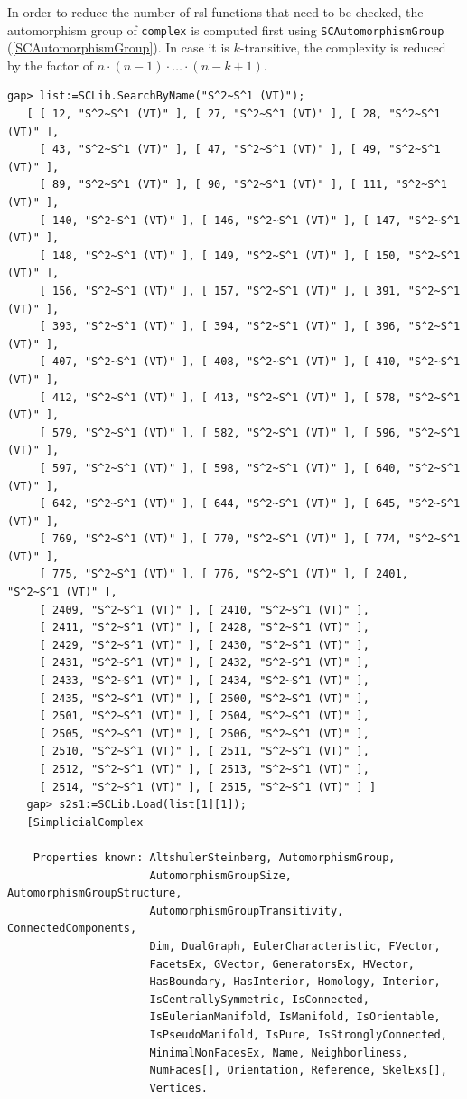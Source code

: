 \documentclass[a4paper,11pt]{report}
\begin{document}
{{{ In order to reduce the number of rsl-functions that need to be checked, the
automorphism group of \texttt{complex} is computed first using \texttt{SCAutomorphismGroup} (\ref{SCAutomorphismGroup}). In case it is $k$-transitive, the complexity is reduced by the factor of $n \cdot (n-1) \cdot \dots \cdot (n-k+1)$. 
\begin{Verbatim}[commandchars=!@|,fontsize=\small,frame=single,label=Example]
   gap> list:=SCLib.SearchByName("S^2~S^1 (VT)");
   [ [ 12, "S^2~S^1 (VT)" ], [ 27, "S^2~S^1 (VT)" ], [ 28, "S^2~S^1 (VT)" ], 
     [ 43, "S^2~S^1 (VT)" ], [ 47, "S^2~S^1 (VT)" ], [ 49, "S^2~S^1 (VT)" ], 
     [ 89, "S^2~S^1 (VT)" ], [ 90, "S^2~S^1 (VT)" ], [ 111, "S^2~S^1 (VT)" ], 
     [ 140, "S^2~S^1 (VT)" ], [ 146, "S^2~S^1 (VT)" ], [ 147, "S^2~S^1 (VT)" ], 
     [ 148, "S^2~S^1 (VT)" ], [ 149, "S^2~S^1 (VT)" ], [ 150, "S^2~S^1 (VT)" ], 
     [ 156, "S^2~S^1 (VT)" ], [ 157, "S^2~S^1 (VT)" ], [ 391, "S^2~S^1 (VT)" ], 
     [ 393, "S^2~S^1 (VT)" ], [ 394, "S^2~S^1 (VT)" ], [ 396, "S^2~S^1 (VT)" ], 
     [ 407, "S^2~S^1 (VT)" ], [ 408, "S^2~S^1 (VT)" ], [ 410, "S^2~S^1 (VT)" ], 
     [ 412, "S^2~S^1 (VT)" ], [ 413, "S^2~S^1 (VT)" ], [ 578, "S^2~S^1 (VT)" ], 
     [ 579, "S^2~S^1 (VT)" ], [ 582, "S^2~S^1 (VT)" ], [ 596, "S^2~S^1 (VT)" ], 
     [ 597, "S^2~S^1 (VT)" ], [ 598, "S^2~S^1 (VT)" ], [ 640, "S^2~S^1 (VT)" ], 
     [ 642, "S^2~S^1 (VT)" ], [ 644, "S^2~S^1 (VT)" ], [ 645, "S^2~S^1 (VT)" ], 
     [ 769, "S^2~S^1 (VT)" ], [ 770, "S^2~S^1 (VT)" ], [ 774, "S^2~S^1 (VT)" ], 
     [ 775, "S^2~S^1 (VT)" ], [ 776, "S^2~S^1 (VT)" ], [ 2401, "S^2~S^1 (VT)" ], 
     [ 2409, "S^2~S^1 (VT)" ], [ 2410, "S^2~S^1 (VT)" ], 
     [ 2411, "S^2~S^1 (VT)" ], [ 2428, "S^2~S^1 (VT)" ], 
     [ 2429, "S^2~S^1 (VT)" ], [ 2430, "S^2~S^1 (VT)" ], 
     [ 2431, "S^2~S^1 (VT)" ], [ 2432, "S^2~S^1 (VT)" ], 
     [ 2433, "S^2~S^1 (VT)" ], [ 2434, "S^2~S^1 (VT)" ], 
     [ 2435, "S^2~S^1 (VT)" ], [ 2500, "S^2~S^1 (VT)" ], 
     [ 2501, "S^2~S^1 (VT)" ], [ 2504, "S^2~S^1 (VT)" ], 
     [ 2505, "S^2~S^1 (VT)" ], [ 2506, "S^2~S^1 (VT)" ], 
     [ 2510, "S^2~S^1 (VT)" ], [ 2511, "S^2~S^1 (VT)" ], 
     [ 2512, "S^2~S^1 (VT)" ], [ 2513, "S^2~S^1 (VT)" ], 
     [ 2514, "S^2~S^1 (VT)" ], [ 2515, "S^2~S^1 (VT)" ] ]
   gap> s2s1:=SCLib.Load(list[1][1]);
   [SimplicialComplex
   
    Properties known: AltshulerSteinberg, AutomorphismGroup, 
                      AutomorphismGroupSize, AutomorphismGroupStructure, 
                      AutomorphismGroupTransitivity, ConnectedComponents, 
                      Dim, DualGraph, EulerCharacteristic, FVector, 
                      FacetsEx, GVector, GeneratorsEx, HVector, 
                      HasBoundary, HasInterior, Homology, Interior, 
                      IsCentrallySymmetric, IsConnected, 
                      IsEulerianManifold, IsManifold, IsOrientable, 
                      IsPseudoManifold, IsPure, IsStronglyConnected, 
                      MinimalNonFacesEx, Name, Neighborliness, 
                      NumFaces[], Orientation, Reference, SkelExs[], 
                      Vertices.
   

\end{Verbatim}}}}
\end{document}
